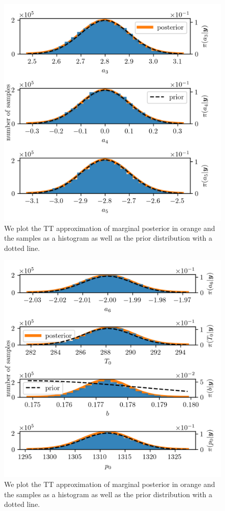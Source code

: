 \begin{figure}[ht!]
	\centering
	\includegraphics{PHdPTPost3.png}
	\caption[Histograms and TT approximation of posterior distribution as well as hyper-prior distribution.]{We plot the TT approximation of marginal posterior in orange and the samples as a histogram as well as the prior distribution with a dotted line.}
	\label{fig:PostHistTT3}
\end{figure}
\begin{figure}[ht!]
	\centering
	\includegraphics{PHdPTPost4.png}
	\caption[Histograms and TT approximation of posterior distribution as well as hyper-prior distribution.]{We plot the TT approximation of marginal posterior in orange and the samples as a histogram as well as the prior distribution with a dotted line.}
	\label{fig:PostHistTT4}
\end{figure}
